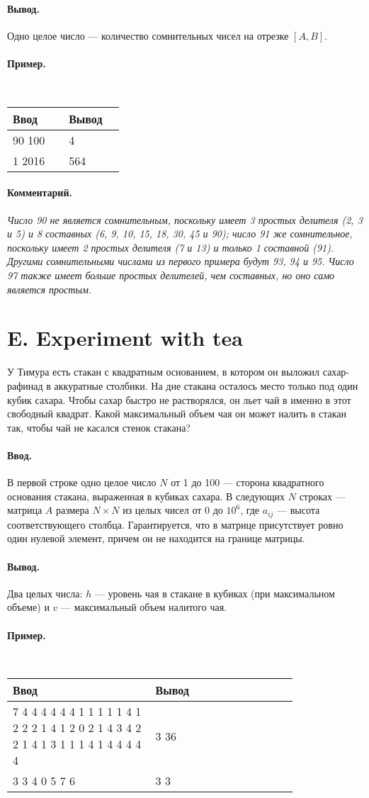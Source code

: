\documentclass[12pt, a5paper]{article}
\newcommand{\informat}[1]
{
	\paragraph{Ввод.\\} #1
}
\newcommand{\outformat}[1]
{
	\paragraph{Вывод.\\} #1
}
\newcommand{\examplee}[4]
{
	\paragraph{Пример.\\}
	{\tt
	\begin{tabular}{|p{0.4\linewidth}|p{0.4\linewidth}|}
	\hline
	Ввод 	& Вывод  	\\
	\hline
	#1 		& #2 		\\
	\hline
	#3		& #4		\\
	\hline
	\end{tabular}
	}
}
\newcommand{\excomm}[1]
{
	\paragraph{Комментарий. \\}
	\textit{#1}
}
\begin{document}
\outformat{Одно целое число --- количество сомнительных чисел на отрезке $[A, B]$.}

\examplee{90 100}{4}{1 2016}{564}

\excomm{Число 90 не является сомнительным, поскольку имеет 3 простых делителя (2, 3 и 5) и 8 составных (6, 9, 10, 15, 18, 30, 45 и 90); число 91 же сомнительное, поскольку имеет 2 простых делителя (7 и 13) и только 1 составной (91). Другими сомнительными числами из первого примера будут 93, 94 и 95. Число 97 также имеет больше простых делителей, чем составных, но оно само является простым.}



\section*{E. Experiment with tea}

У Тимура есть стакан с квадратным основанием, в котором он выложил сахар-рафинад в аккуратные столбики. На дне стакана осталось место только под один кубик сахара. Чтобы сахар быстро не растворялся, он льет чай в именно в этот свободный квадрат. Какой максимальный объем чая он может налить в стакан так, чтобы чай не касался стенок стакана?



\informat{В первой строке одно целое число $N$ от 1 до 100 --- сторона квадратного основания стакана, выраженная в кубиках сахара. \newline
В следующих $N$ строках ---  матрица $A$ размера $N \times N$ из целых чисел от 0 до $10^6$, где $a_{ij}$ --- высота соответствующего столбца. Гарантируется, что в матрице присутствует ровно один нулевой элемент, причем он не находится на границе матрицы.}

\outformat{Два целых числа: $h$ --- уровень чая в стакане в кубиках (при максимальном объеме) и $v$ --- максимальный объем налитого чая.}

\examplee{7 \newline
4 4 4 4 4 4 4  \newline
4 1 1 1 1 1 4  \newline
4 1 2 2 2 1 4  \newline
4 1 2 0 2 1 4  \newline
4 3 4 2 2 1 4  \newline
1 1 3 1 1 1 4  \newline
1 1 4 4 4 4 4}{3 36}
{3 \newline
2 3 4 \newline
9 0 5 \newline
8 7 6}{3 3}
\end{document}
